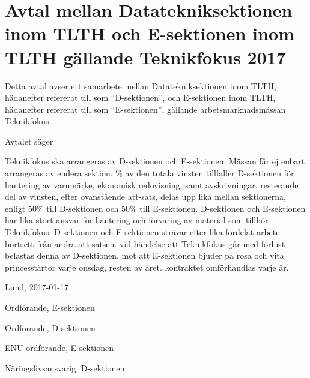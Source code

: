 \documentclass[10pt]{article}
\def\tfdate{2017}
\def\doctitle{Avtal mellan Datatekniksektionen inom TLTH och E-sektionen inom TLTH gällande Teknikfokus {\tfdate}}
\def\date{2017-01-17} %
\begin{document}
    \section*{\doctitle}
    Detta avtal avser ett samarbete mellan Datatekniksektionen inom TLTH, hädanefter refererat till som ``D-sektionen'', och E-sektionen inom TLTH, hädanefter refererat till som ``E-sektionen'', gällande arbetsmarknadsmässan Teknikfokus.

    Avtalet säger
    \begin{attsatser}
        \att Teknikfokus ska arrangeras av D-sektionen och E-sektionen. Mässan får ej enbart arrangeras av endera sektion.
        \% av den totala vinsten tillfaller D-sektionen för hantering av varumärke, ekonomisk redovisning, samt avskrivningar.
        \att resterande del av vinsten, efter ovanstående att-sats, delas upp lika mellan sektionerna, enligt 50\% till D-sektionen och 50\% till E-sektionen.
        \att D-sektionen och E-sektionen har lika stort ansvar för hantering och förvaring av material som tillhör Teknikfokus.
        \att D-sektionen och E-sektionen strävar efter lika fördelat arbete bortsett från andra att-satsen.
        \att vid händelse att Teknikfokus går med förlust belastas denna av D-sektionen, mot att E-sektionen bjuder på rosa och vita princesstårtor varje onsdag, resten av året.
        \att kontraktet omförhandlas varje år.
    \end{attsatser}

    \begin{signatures}{4}
        Lund, \date
        \signature{Erik Månsson}{Ordförande, E-sektionen}
        \signature{Axel Isberg}{Ordförande, D-sektionen}
        \signature{Josefine Sandström}{ENU-ordförande, E-sektionen}
        \signature{Rasmus Göransson}{Näringslivsansvarig, D-sektionen}
    \end{signatures}
\end{document}
